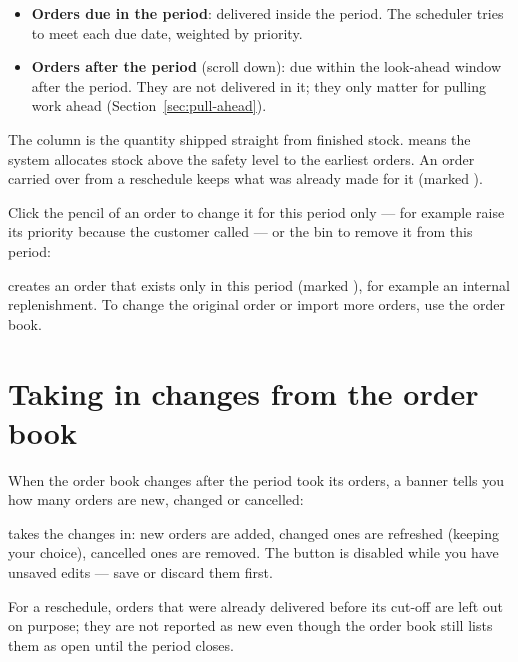 \begin{itemize}
  \item \textbf{Orders due in the period}: delivered inside the period. The scheduler tries to meet each due
        date, weighted by priority.
  \item \textbf{Orders after the period} (scroll down): due within the look-ahead window after the period.
        They are not delivered in it; they only matter for pulling work ahead (Section~\ref{sec:pull-ahead}).
\end{itemize}

The  column is the quantity shipped straight from finished stock.  means the system
allocates stock above the safety level to the earliest orders. An order carried over from a reschedule keeps
what was already made for it (marked ).

Click the pencil of an order to change it for this period only --- for example raise its priority because the
customer called --- or the bin to remove it from this period:


 creates an order that exists only in this period (marked ), for
example an internal replenishment. To change the original order or import more orders, use the order book.

\section{Taking in changes from the order book}\label{sec:sync}

When the order book changes after the period took its orders, a banner tells you how many orders are new,
changed or cancelled:


 takes the changes in: new orders are added, changed ones are refreshed (keeping your
 choice), cancelled ones are removed. The button is disabled while you have unsaved edits ---
save or discard them first.

\begin{note}
For a reschedule, orders that were already delivered before its cut-off are left out on purpose; they are not
reported as new even though the order book still lists them as open until the period closes.
\end{note}


